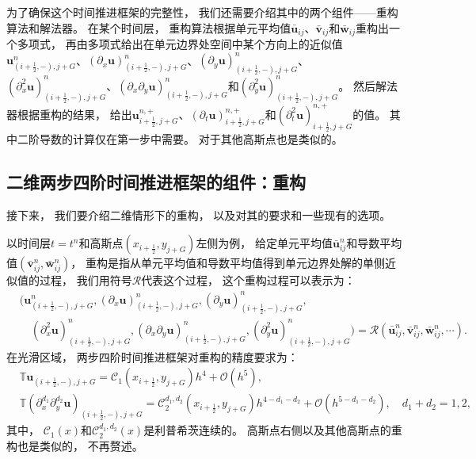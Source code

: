 为了确保这个时间推进框架的完整性，
我们还需要介绍其中的两个组件——重构算法和解法器。
在某个时间层，
重构算法根据单元平均值$\bar{\bm{u}}_{ij}$、$\bar{\bm{v}}_{ij}$和$\bar{\bm{w}}_{ij}$重构出一个多项式，
再由多项式给出在单元边界处空间中某个方向上的近似值${\bm{u}}_{(i+\frac{1}{2},-),j+G}^n$、$\left({\partial_{x}}{\bm{u}}\right)_{(i+\frac{1}{2},-),j+G}^n$、$\left({\partial_{y}}{\bm{u}}\right)_{(i+\frac{1}{2},-),j+G}^n$、$\left({\partial_{x}^2}{\bm{u}}\right)_{(i+\frac{1}{2},-),j+G}^n$、$\left({\partial_{x}}{\partial_{y}}{\bm{u}}\right)_{(i+\frac{1}{2},-),j+G}^n$和$\left({\partial_{y}^2}{\bm{u}}\right)_{(i+\frac{1}{2},-),j+G}^n$。
然后解法器根据重构的结果，
给出${\bm{u}}_{i+\frac{1}{2},j+G}^{n, +}$、$\left({\partial_{t}}{\bm{u}}\right)_{i+\frac{1}{2},j+G}^{n, +}$和$\left({\partial_{t}^2}{\bm{u}}\right)_{i+\frac{1}{2},j+G}^{n, +}$的值。
其中二阶导数的计算仅在第一步中需要。
对于其他高斯点也是类似的。

\subsection{二维两步四阶时间推进框架的组件：重构}

接下来，
我们要介绍二维情形下的重构，
以及对其的要求和一些现有的选项。

以时间层$t=t^n$和高斯点$(x_{i+\frac{1}{2}},y_{j+G})$左侧为例，
给定单元平均值$\bar{\bm{u}}_{ij}^n$和导数平均值$(\bar{\bm{v}}_{ij}^n,\bar{\bm{w}}_{ij}^n)$，
重构是指从单元平均值和导数平均值得到单元边界处解的单侧近似值的过程，
我们用符号$\mathcal{R}$代表这个过程，
这个重构过程可以表示为：
\begin{equation}
  \label{eq:2D-reconstruction}
  \begin{aligned}
     & \bigg({\bm{u}}_{(i+\frac{1}{2},-),j+G}^n, \left({\partial_{x}}{\bm{u}}\right)_{(i+\frac{1}{2},-),j+G}^n, \left({\partial_{y}}{\bm{u}}\right)_{(i+\frac{1}{2},-),j+G}^n,                                           \\
     & \quad\left({\partial_{x}^2}{\bm{u}}\right)_{(i+\frac{1}{2},-),j+G}^n,\left({\partial_{x}}{\partial_{y}}{\bm{u}}\right)_{(i+\frac{1}{2},-),j+G}^n,\left({\partial_{y}^2}{\bm{u}}\right)_{(i+\frac{1}{2},-),j+G}^n
    \bigg)
    = \mathcal{R} (\bar{\bm{u}}_{ij}^n, \bar{\bm{v}}_{ij}^n, \bar{\bm{w}}_{ij}^n, \cdots).
  \end{aligned}
\end{equation}
在光滑区域，
两步四阶时间推进框架对重构的精度要求为：
\begin{equation}
  \label{eq:2D-rec}
  \begin{aligned}
     & {\mathbb{T}}{\bm u}_{(i+\frac12,-), j+G} = \mathcal{C}_1(x_{i+\frac{1}{2}}, y_{j+G})h^4+{\mathcal{O}}(h^{5}),                                                                                                  \\
     & {\mathbb{T}}\left({\partial_x^{d_1}\partial_y^{d_2}}{\bm u}\right)_{(i+\frac12,-), j+G} = \mathcal{C}_2^{d_1,d_2}(x_{i+\frac{1}{2}}, y_{j+G})h^{4-d_1-d_2}+{\mathcal{O}}(h^{5-d_1-d_2}), \quad d_1+d_2 = 1,2,
  \end{aligned}
\end{equation}
其中，
$\mathcal{C}_1(x)$和$\mathcal{C}_2^{d_1,d_2}(x)$是利普希茨连续的。
高斯点右侧以及其他高斯点的重构也是类似的，
不再赘述。

